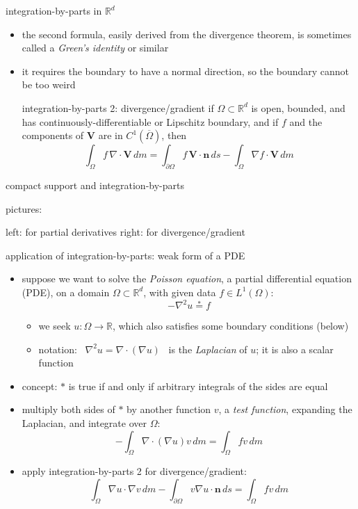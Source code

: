\documentclass[10pt,
               svgnames,
               hyperref={colorlinks,
                         citecolor=DeepPink4,
                         linkcolor=FireBrick,
                         urlcolor=blue},
               usepdftitle=false]{beamer}
\newcommand{\bn}{\mathbf{n}}
\newcommand{\bV}{\mathbf{V}}
\newcommand{\RR}{\mathbb{R}}
\newcommand{\Div}{\nabla\cdot}
\newcommand{\grad}{\nabla}
\begin{document}
\begin{frame}{integration-by-parts in $\RR^d$}

\begin{itemize}
\item the second formula, easily derived from the divergence theorem, is sometimes called a \emph{Green's identity} or similar
\item it requires the boundary to have a normal direction, so the boundary cannot be too weird

\begin{block}{integration-by-parts 2: divergence/gradient}
if $\Omega\subset\RR^d$ is open, bounded, and has continuously-differentiable or Lipschitz boundary, and if $f$ and the components of $\bV$ are in $C^1(\overline{\Omega})$, then
    $$\int_\Omega f\,\Div \bV\,dm = \int_{\partial\Omega} f\,\bV\cdot \bn\,ds - \int_\Omega \grad f\cdot \bV\,dm$$
\end{block}
\end{itemize}
\end{frame}


\begin{frame}{compact support and integration-by-parts}

\noindent pictures:

\vspace{70mm}

{\footnotesize left: for partial derivatives \hfill right: for divergence/gradient}
\end{frame}


\begin{frame}{application of integration-by-parts: weak form of a PDE}

\begin{itemize}
\item suppose we want to solve the \emph{Poisson equation}, a partial differential equation (PDE), on a domain $\Omega \subset \RR^d$, with given data $f\in L^1(\Omega)$:
	$$-\grad^2 u \stackrel{\ast}{=} f$$

    \begin{itemize}
    \item[$\circ$] we seek $u:\Omega \to \RR$, which also satisfies some boundary conditions (below)
    \item[$\circ$] notation: \, $\grad^2 u = \Div(\grad u)$ \, is the \emph{Laplacian} of $u$; it is also a scalar function
    \end{itemize}
\item concept: $\ast$ is true if and only if arbitrary integrals of the sides are equal
\item multiply both sides of $\ast$ by another function $v$, a \emph{test function}, expanding the Laplacian, and integrate over $\Omega$:
	$$- \int_\Omega \Div(\grad u) v\,dm = \int_\Omega f v\,dm$$
\item apply integration-by-parts 2 for divergence/gradient:
	$$\int_\Omega \grad u\cdot \grad v\,dm - \int_{\partial \Omega} v \grad u\cdot \bn\,ds = \int_\Omega f v\,dm$$
\end{itemize}
\end{frame}
\end{document}
